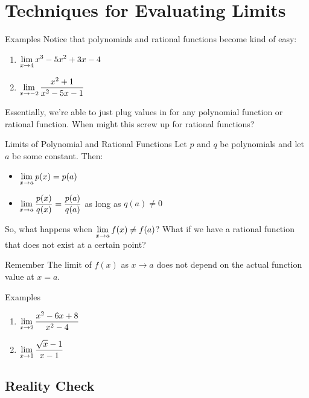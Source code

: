 \section{Techniques for Evaluating Limits}


\begin{note}{Examples}
  Notice that polynomials and rational functions become kind of easy:
  \begin{enumerate}
    \item $\displaystyle \lim_{x\to 4}x^3-5x^2+3x-4$
    \item $\displaystyle \lim_{x\to -2} \dfrac{x^2+1}{x^2-5x-1}$
  \end{enumerate}
\end{note}

Essentially, we're able to just plug values in for any polynomial function or rational function.
When might this screw up for rational functions?

\begin{thm}{Limits of Polynomial and Rational Functions}
  Let $p$ and $q$ be polynomials and let $a$ be some constant.
  Then:
  \begin{itemize}
    \item $\displaystyle \lim_{x\to a} p(x) = p(a)$
    \item $\displaystyle \lim_{x\to a} \dfrac{p(x)}{q(x)} = \dfrac{p(a)}{q(a)}$ as long as $q(a)\neq 0$
  \end{itemize}
\end{thm}

So, what happens when $\displaystyle \lim_{x\to a} f(x) \neq f(a)$?
What if we have a rational function that does not exist at a certain point?

\begin{note}{Remember}
  The limit of $f(x)$ as $x\to a$ does not depend on the actual function value at $x=a$.
\end{note}

\begin{note}{Examples}
  \begin{multicols}{2}
    \begin{enumerate}
      \item $\displaystyle \lim_{x\to2} \dfrac{x^2-6x+8}{x^2-4}$
      \item $\displaystyle \lim_{x\to1} \dfrac{\sqrt{x}-1}{x-1}$
    \end{enumerate}
  \end{multicols}
\end{note}

\subsection*{Reality Check}

